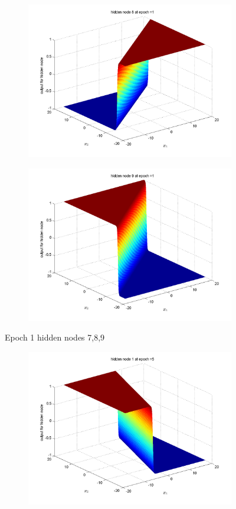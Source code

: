 \documentclass{article}
\begin{document}
\begin{flushleft}
\begin{figure}
\begin{subfigure}{.3\textwidth}
\end{subfigure}%
\begin{subfigure}{.3\textwidth}
  \centering
  \includegraphics[width=.8\linewidth]{Classification/linearlySeparable/h1_8}
  
\end{subfigure}
\begin{subfigure}{.3\textwidth}
  \centering
  \includegraphics[width=.8\linewidth]{Classification/linearlySeparable/h1_9}
  
\end{subfigure}
\caption{Epoch 1 hidden nodes 7,8,9}
\end{figure}

\newpage
\begin{figure}
\begin{subfigure}{.3\textwidth}
  \centering
  \includegraphics[width=.8\linewidth]{Classification/linearlySeparable/h5_1}
 

\end{subfigure}
\end{figure}
\end{flushleft}
\end{document}
